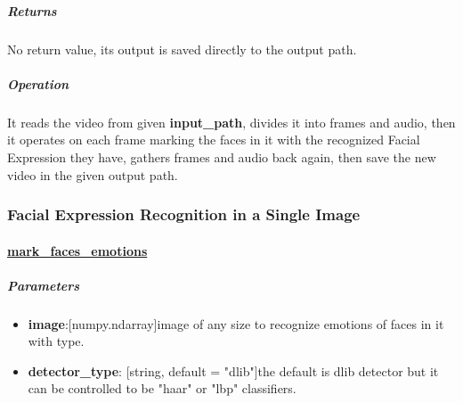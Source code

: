 \subparagraph{Returns} 
\begin{changemargin}{1cm}{0cm} 
No return value, its output is saved directly to the output path.
\end{changemargin}

\subparagraph{Operation}
\begin{changemargin}{1cm}{0cm} 
It reads the video from given \textbf{input\_path}, divides it into frames and audio, then it operates on each frame marking the faces in it with the recognized Facial Expression they have, gathers frames and audio back again, then save the new video in the given output path.
\end{changemargin}

\begin{comment}
\subparagraph{Usage:}
\begin{changemargin}{0.5cm}{0cm} 
	\begin{itemize}
		\item import the module:
		\begin{lstlisting}[language=Python]
		from Cerebro.interface Import process_video as pv\end{lstlisting}
		\item call it:
		\begin{lstlisting}[language=Python]
		pv.detect_video_emotion(video_path, output_path, skip,detector_type, verbose)\end{lstlisting}
	\end{itemize}
\end{changemargin}
\end{comment}
\newpage
\subsubsection{Facial Expression Recognition in a Single Image}
\paragraph{\underline{mark\_faces\_emotions}}

\subparagraph{Parameters}
\begin{changemargin}{0.5cm}{0cm}
\begin{itemize}
	\item \textbf{image}:[numpy.ndarray]image of any size to recognize emotions of faces in it with type.
	\item \textbf{detector\_type}: [string, default = "dlib"]the default is dlib detector but it can be controlled to be "haar" or "lbp" classifiers.	
\end{itemize}
\end{changemargin}

